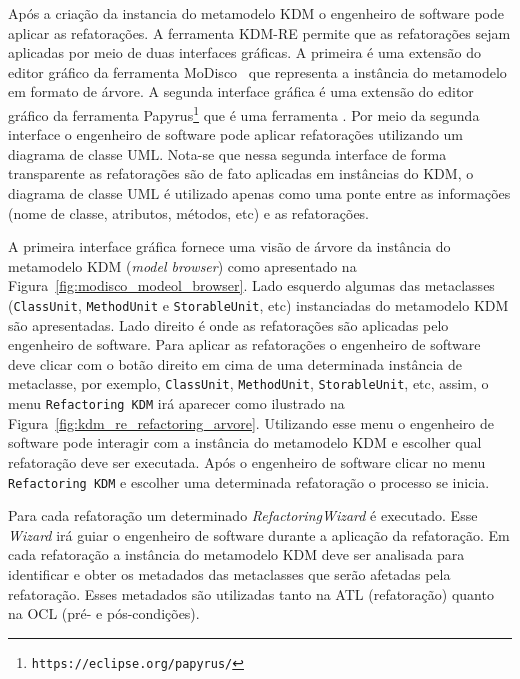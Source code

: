 Após a criação da instancia do metamodelo KDM o engenheiro de software pode aplicar as refatorações. A ferramenta KDM-RE permite que as refatorações sejam aplicadas por meio de duas interfaces gráficas. A primeira é uma extensão do editor gráfico da ferramenta MoDisco~\cite{Bruneliere_2014} que representa a instância do metamodelo em formato de árvore. A segunda interface gráfica é uma extensão do editor gráfico da ferramenta Papyrus\footnote{\texttt{https://eclipse.org/papyrus/}} que é uma ferramenta . Por meio da segunda interface o engenheiro de software pode aplicar refatorações utilizando um diagrama de classe UML. Nota-se que nessa segunda interface de forma transparente as refatorações são de fato aplicadas em instâncias do KDM, o diagrama de classe UML é utilizado apenas como uma ponte entre as informações (nome de classe, atributos, métodos, etc) e as refatorações.

A primeira interface gráfica fornece uma visão de árvore da instância do metamodelo KDM (\textit{model browser}) como apresentado na Figura~\ref{fig:modisco_modeol_browser}. Lado esquerdo algumas das metaclasses (\texttt{ClassUnit}, \texttt{MethodUnit} e \texttt{StorableUnit}, etc) instanciadas do metamodelo KDM são apresentadas. Lado direito é onde as refatorações são aplicadas pelo engenheiro de software. Para aplicar as refatorações o engenheiro de software deve clicar com o botão direito em cima de uma determinada instância de metaclasse, por exemplo, \texttt{ClassUnit}, \texttt{MethodUnit}, \texttt{StorableUnit}, etc, assim, o menu \texttt{Refactoring KDM} irá aparecer como ilustrado na Figura~\ref{fig:kdm_re_refactoring_arvore}. Utilizando esse menu o engenheiro de software pode interagir com a instância do metamodelo KDM e escolher qual refatoração deve ser executada. Após o engenheiro de software clicar no menu \texttt{Refactoring KDM} e escolher uma determinada refatoração o processo se inicia. 

Para cada refatoração um determinado \textit{RefactoringWizard} é executado. Esse \textit{Wizard} irá guiar o engenheiro de software durante a aplicação da refatoração. Em cada refatoração a instância do metamodelo KDM deve ser analisada para identificar e obter os metadados das metaclasses que serão afetadas pela refatoração. Esses metadados são utilizadas tanto na ATL (refatoração) quanto na OCL (pré- e pós-condições). 


